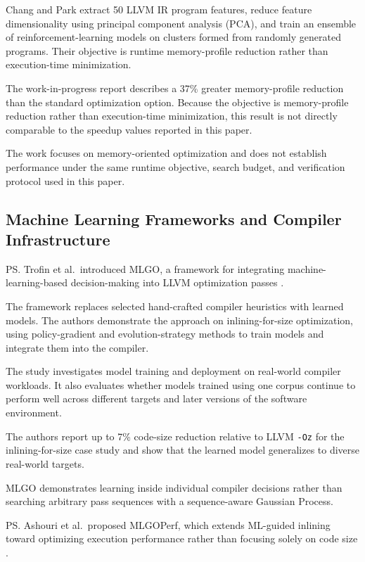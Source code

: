 Chang and Park extract 50 LLVM IR program features, reduce feature dimensionality using principal component analysis (PCA), and train an ensemble of reinforcement-learning models on clusters formed from randomly generated programs. Their objective is runtime memory-profile reduction rather than execution-time minimization.

\re{} The work-in-progress report describes a 37\% greater memory-profile reduction than the standard optimization option. Because the objective is memory-profile reduction rather than execution-time minimization, this result is not directly comparable to the speedup values reported in this paper.

\rg{} The work focuses on memory-oriented optimization and does not establish performance under the same runtime objective, search budget, and verification protocol used in this paper.

\subsection{Machine Learning Frameworks and Compiler Infrastructure}
\ps{} Trofin et al.\ introduced MLGO, a framework for integrating machine-learning-based decision-making into LLVM optimization passes \cite{trofin2021mlgo}.

\me{} The framework replaces selected hand-crafted compiler heuristics with learned models. The authors demonstrate the approach on inlining-for-size optimization, using policy-gradient and evolution-strategy methods to train models and integrate them into the compiler.

The study investigates model training and deployment on real-world compiler workloads. It also evaluates whether models trained using one corpus continue to perform well across different targets and later versions of the software environment.

\re{} The authors report up to 7\% code-size reduction relative to LLVM \texttt{-Oz} for the inlining-for-size case study and show that the learned model generalizes to diverse real-world targets.

\rg{} MLGO demonstrates learning inside individual compiler decisions rather than searching arbitrary pass sequences with a sequence-aware Gaussian Process.

\ps{} Ashouri et al.\ proposed MLGOPerf, which extends ML-guided inlining toward optimizing execution performance rather than focusing solely on code size \cite{ashouri2022mlgoperf}.

